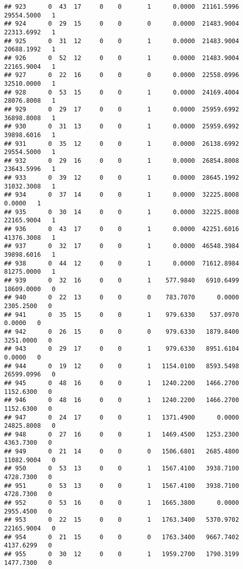\documentclass[
]{article}
\begin{document}
\begin{enumerate}
\begin{verbatim}
## 923      0  43  17     0    0       1      0.0000  21161.5996  29554.5000   1
## 924      0  29  15     0    0       0      0.0000  21483.9004  22313.6992   1
## 925      0  31  12     0    0       1      0.0000  21483.9004  20688.1992   1
## 926      0  52  12     0    0       1      0.0000  21483.9004  22165.9004   1
## 927      0  22  16     0    0       0      0.0000  22558.0996  32510.0000   1
## 928      0  53  15     0    0       1      0.0000  24169.4004  28076.8008   1
## 929      0  29  17     0    0       1      0.0000  25959.6992  36898.8008   1
## 930      0  31  13     0    0       1      0.0000  25959.6992  39898.6016   1
## 931      0  35  12     0    0       1      0.0000  26138.6992  29554.5000   1
## 932      0  29  16     0    0       1      0.0000  26854.8008  23643.5996   1
## 933      0  39  12     0    0       1      0.0000  28645.1992  31032.3008   1
## 934      0  37  14     0    0       1      0.0000  32225.8008      0.0000   1
## 935      0  30  14     0    0       1      0.0000  32225.8008  22165.9004   1
## 936      0  43  17     0    0       1      0.0000  42251.6016  41376.3008   1
## 937      0  32  17     0    0       1      0.0000  46548.3984  39898.6016   1
## 938      0  44  12     0    0       1      0.0000  71612.8984  81275.0000   1
## 939      0  32  16     0    0       1    577.9840   6910.6499  18609.0000   0
## 940      0  22  13     0    0       0    783.7070      0.0000   2305.2500   0
## 941      0  35  15     0    0       1    979.6330    537.0970      0.0000   0
## 942      0  26  15     0    0       0    979.6330   1879.8400   3251.0000   0
## 943      0  29  17     0    0       1    979.6330   8951.6104      0.0000   0
## 944      0  19  12     0    0       1   1154.0100   8593.5498  26599.0996   0
## 945      0  48  16     0    0       1   1240.2200   1466.2700   1152.6300   0
## 946      0  48  16     0    0       1   1240.2200   1466.2700   1152.6300   0
## 947      0  24  17     0    0       1   1371.4900      0.0000  24825.8008   0
## 948      0  27  16     0    0       1   1469.4500   1253.2300   4363.7300   0
## 949      0  21  14     0    0       0   1506.6801   2685.4800  11082.9004   0
## 950      0  53  13     0    0       1   1567.4100   3938.7100   4728.7300   0
## 951      0  53  13     0    0       1   1567.4100   3938.7100   4728.7300   0
## 952      0  53  16     0    0       1   1665.3800      0.0000   2955.4500   0
## 953      0  22  15     0    0       1   1763.3400   5370.9702  22165.9004   0
## 954      0  21  15     0    0       0   1763.3400   9667.7402   4137.6299   0
## 955      0  30  12     0    0       1   1959.2700   1790.3199   1477.7300   0

\end{verbatim}
\end{enumerate}
\end{document}
